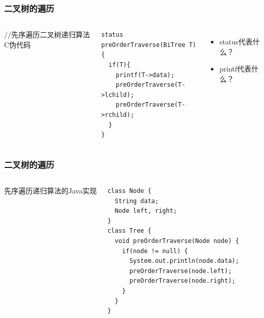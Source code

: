 \begin{frame}[fragile]
  \frametitle{二叉树的遍历}
  \begin{columns}[T]
    //先序遍历二叉树递归算法C伪代码
    \begin{verbatim}
status preOrderTraverse(BiTree T){
  if(T){
    printf(T->data);
    preOrderTraverse(T->lchild);
    preOrderTraverse(T->rchild);
  }
}
    \end{verbatim}
    \begin{itemize}
    \item status代表什么？
    \item printf代表什么？
    \end{itemize}

  \end{columns}
\end{frame}


\begin{frame}[fragile]
  \frametitle{二叉树的遍历}
  \begin{columns}[T]
    先序遍历递归算法的Java实现
  
    \begin{verbatim}
class Node {
  String data;
  Node left, right;
}
class Tree {
  void preOrderTraverse(Node node) {
    if(node != null) {
      System.out.println(node.data);
      preOrderTraverse(node.left);
      preOrderTraverse(node.right);
    }
  }
}
    \end{verbatim}

  \end{columns}
\end{frame}

